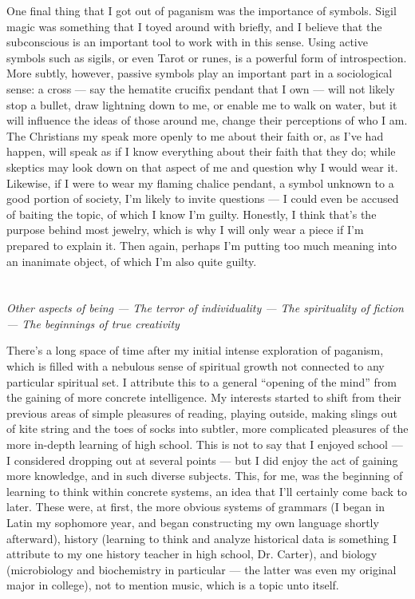 \documentclass{book}
\begin{document}
One final thing that I got out of paganism was the importance of
symbols.  Sigil magic was something that I toyed around with briefly,
and I believe that the subconscious is an important tool to work with in
this sense.  Using active symbols such as sigils, or even Tarot or
runes, is a powerful form of introspection.  More subtly, however,
passive symbols play an important part in a sociological sense: a cross
--- say the hematite crucifix pendant that I own --- will not likely
stop a bullet, draw lightning down to me, or enable me to walk on water,
but it will influence the ideas of those around me, change their
perceptions of who I am.  The Christians my speak more openly to me
about their faith or, as I've had happen, will speak as if I know
everything about their faith that they do; while skeptics may look down
on that aspect of me and question why I would wear it.  Likewise, if I
were to wear my flaming chalice pendant, a symbol unknown to a good
portion of society, I'm likely to invite questions --- I could even be
accused of baiting the topic, of which I know I'm guilty.  Honestly, I
think that's the purpose behind most jewelry, which is why I will only
wear a piece if I'm prepared to explain it.  Then again, perhaps I'm
putting too much meaning into an inanimate object, of which I'm also
quite guilty.

\chapter{}
\begin{center}
	\emph{Other aspects of being --- The terror of individuality --- The spirituality of fiction --- The beginnings of true creativity}
\end{center}

There's a long space of time after my initial intense exploration of paganism, which is filled with a nebulous sense of spiritual growth not connected to any particular spiritual set.  I attribute this to a general ``opening of the mind'' from the gaining of more concrete intelligence.  My interests started to shift from their previous areas of simple pleasures of reading, playing outside, making slings out of kite string and the toes of socks into subtler, more complicated pleasures of the more in-depth learning of high school.  This is not to say that I enjoyed school --- I considered dropping out at several points --- but I did enjoy the act of gaining more knowledge, and in such diverse subjects.  This, for me, was the beginning of learning to think within concrete systems, an idea that I'll certainly come back to later.  These were, at first, the more obvious systems of grammars (I began in Latin my sophomore year, and began constructing my own language shortly afterward), history (learning to think and analyze historical data is something I attribute to my one history teacher in high school, Dr.  Carter), and biology (microbiology and biochemistry in particular --- the latter was even my original major in college), not to mention music, which is a topic unto itself.
\end{document}
